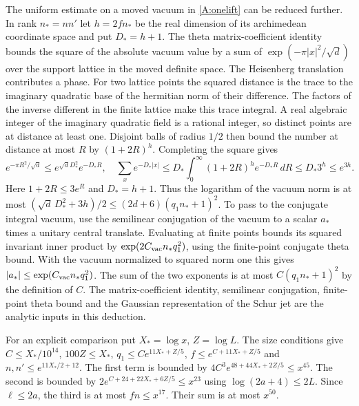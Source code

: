 The uniform estimate on a moved vacuum in \eqref{A:onelift} can be reduced further. In rank $n_*=nn'$ let $h=2fn_*$ be the real dimension of its archimedean coordinate space and put $D_*=h+1$. The theta matrix-coefficient identity bounds the square of the absolute vacuum value by a sum of $\exp(-\pi|x|^2/\sqrt d)$ over the support lattice in the moved definite space. The Heisenberg translation contributes a phase. For two lattice points the squared distance is the trace to the imaginary quadratic base of the hermitian norm of their difference. The factors of the inverse different in the finite lattice make this trace integral. A real algebraic integer of the imaginary quadratic field is a rational integer, so distinct points are at distance at least one. Disjoint balls of radius $1/2$ then bound the number at distance at most $R$ by $(1+2R)^h$. Completing the square gives
\[
 e^{-\pi R^2/\sqrt d}\le e^{\sqrt d D_*^2}e^{-D_* R},\quad
 \sum_x e^{-D_*|x|}
 \le D_*\int_0^\infty(1+2R)^h e^{-D_* R}\,dR
 \le D_*3^h\le e^{3h}.
\]
Here $1+2R\le3e^R$ and $D_*=h+1$. Thus the logarithm of the vacuum norm is at most $(\sqrt d\,D_*^2+3h)/2\le(2d+6)(q_1n_*+1)^2$. To pass to the conjugate integral vacuum, use the semilinear conjugation of the vacuum to a scalar $a_*$ times a unitary central translate. Evaluating at finite points bounds its squared invariant inner product by $\exp(2C_{\rm vac}n_*q_1^2)$, using the finite-point conjugate theta bound. With the vacuum normalized to squared norm one this gives $|a_*|\le\exp(C_{\rm vac}n_*q_1^2)$. The sum of the two exponents is at most $C(q_1n_*+1)^2$ by the definition of $C$. The matrix-coefficient identity, semilinear conjugation, finite-point theta bound and the Gaussian representation of the Schur jet are the analytic inputs in this deduction.

For an explicit comparison put $X_*=\log x$, $Z=\log L$. The size conditions give $C\le X_*/10^{14}$, $100Z\le X_*$, $q_1\le C e^{11X_*+Z/5}$, $f\le e^{C+11X_*+Z/5}$ and $n,n'\le e^{11X_*/2+12}$. The first term is bounded by $4C^3e^{48+44X_*+2Z/5}\le x^{45}$. The second is bounded by $2e^{C+24+22X_*+6Z/5}\le x^{23}$ using $\log(2a+4)\le2L$. Since $\ell\le2a$, the third is at most $fn\le x^{17}$. Their sum is at most $x^{50}$.

